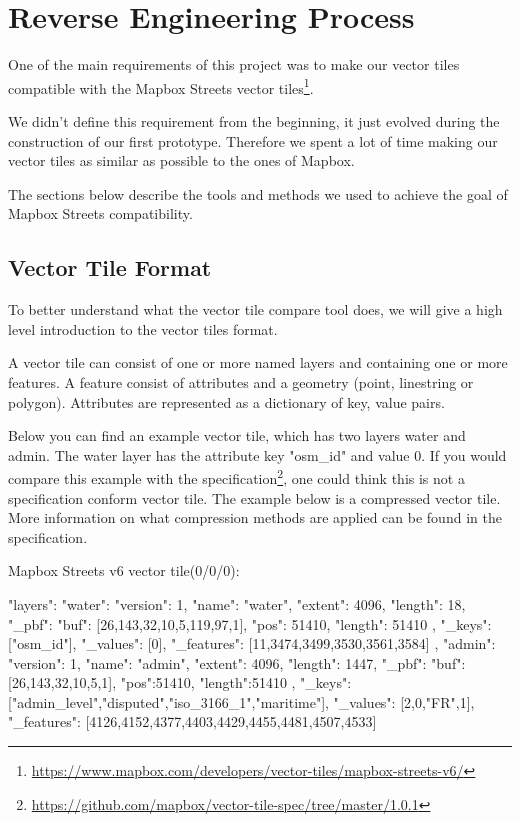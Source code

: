 \section{Reverse Engineering Process}\label{reverse_engineering_process}
One of the main requirements of this project was to make our vector tiles compatible with the Mapbox Streets vector tiles\footnote{\url{https://www.mapbox.com/developers/vector-tiles/mapbox-streets-v6/}}.

We didn't define this requirement from the beginning, it just evolved during the construction of our first prototype.
Therefore we spent a lot of time making our vector tiles as similar as possible to the ones of Mapbox.

The sections below describe the tools and methods we used to achieve the goal of Mapbox Streets compatibility.

\subsection{Vector Tile Format}\label{vector_tile_format}
To better understand what the vector tile compare tool does, we will give a high level introduction to the vector tiles format.

A vector tile can consist of one or more named layers and containing one or more features. A feature consist of attributes and a geometry (point, linestring or polygon). Attributes are represented as a dictionary of key, value pairs. 

Below you can find an example vector tile, which has two layers water and admin. The water layer has the attribute key "osm\_id" and value 0. If you would compare this example with the specification\footnote{\url{https://github.com/mapbox/vector-tile-spec/tree/master/1.0.1}}, one could think this is not a specification conform vector tile. The example below is a compressed vector tile. More information on what compression methods are applied can be found in the specification. 

Mapbox Streets v6 vector tile(0/0/0):
\begin{jsoncode}
{ 
  "layers": {
    "water": {
      "version": 1,
      "name": "water",
      "extent": 4096,
      "length": 18,
      "_pbf": {
        "buf": [26,143,32,10,5,119,97,1],
        "pos": 51410,
        "length": 51410
      },
      "_keys": ["osm_id"],
      "_values": [0],
      "_features": [11,3474,3499,3530,3561,3584] 
    },
    "admin": {
      "version": 1,
      "name": "admin",
      "extent": 4096,
      "length": 1447,
      "_pbf": {
        "buf": [26,143,32,10,5,1],
        "pos":51410,
        "length":51410
       },
      "_keys": ["admin_level","disputed","iso_3166_1","maritime"],
      "_values": [2,0,"FR",1],
      "_features": [4126,4152,4377,4403,4429,4455,4481,4507,4533]
    }
  } 
}
\end{jsoncode}


